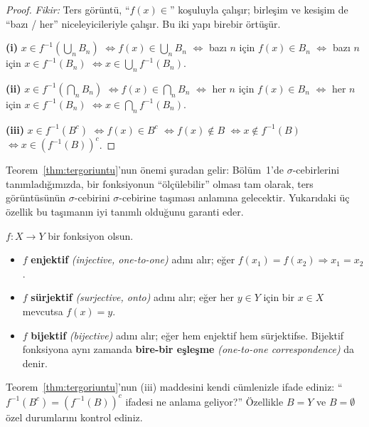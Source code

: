 \begin{proof}
\textit{Fikir:} Ters görüntü, ``$f(x) \in$'' koşuluyla çalışır; birleşim ve
kesişim de ``bazı / her'' niceleyicileriyle çalışır. Bu iki yapı birebir örtüşür.

\medskip

\textbf{(i)}\; $x \in f^{-1}\!\left(\bigcup_n B_n\right)$
$\iff f(x) \in \bigcup_n B_n$
$\iff$ bazı $n$ için $f(x) \in B_n$
$\iff$ bazı $n$ için $x \in f^{-1}(B_n)$
$\iff x \in \bigcup_n f^{-1}(B_n)$.

\textbf{(ii)}\; $x \in f^{-1}\!\left(\bigcap_n B_n\right)$
$\iff f(x) \in \bigcap_n B_n$
$\iff$ her $n$ için $f(x) \in B_n$
$\iff$ her $n$ için $x \in f^{-1}(B_n)$
$\iff x \in \bigcap_n f^{-1}(B_n)$.

\textbf{(iii)}\; $x \in f^{-1}(B^c)$
$\iff f(x) \in B^c$
$\iff f(x) \notin B$
$\iff x \notin f^{-1}(B)$
$\iff x \in \left(f^{-1}(B)\right)^c$.
\end{proof}

\begin{notkutu}
Teorem~\ref{thm:tergoriuntu}'nun önemi şuradan gelir: Bölüm~1'de
$\sigma$-cebirlerini tanımladığımızda, bir fonksiyonun ``ölçülebilir'' olması tam
olarak, ters görüntüsünün $\sigma$-cebirini $\sigma$-cebirine taşıması anlamına
gelecektir. Yukarıdaki üç özellik bu taşımanın iyi tanımlı olduğunu garanti eder.
\end{notkutu}

\begin{tanim}\label{def:bijektif}
$f: X \to Y$ bir fonksiyon olsun.
\begin{itemize}
  \item $f$ \textbf{enjektif} \emph{(injective, one-to-one)} adını alır;
        eğer $f(x_1) = f(x_2) \Rightarrow x_1 = x_2$.
  \item $f$ \textbf{sürjektif} \emph{(surjective, onto)} adını alır;
        eğer her $y \in Y$ için bir $x \in X$ mevcutsa $f(x) = y$.
  \item $f$ \textbf{bijektif} \emph{(bijective)} adını alır;
        eğer hem enjektif hem sürjektifse.
        Bijektif fonksiyona aynı zamanda \textbf{bire-bir eşleşme}
        \emph{(one-to-one correspondence)} da denir.
\end{itemize}
\end{tanim}

\begin{kendinleifade}
Teorem~\ref{thm:tergoriuntu}'nun (iii) maddesini kendi cümlenizle ifade ediniz:
``$f^{-1}(B^c) = (f^{-1}(B))^c$ ifadesi ne anlama geliyor?''
Özellikle $B = Y$ ve $B = \emptyset$ özel durumlarını kontrol ediniz.
\end{kendinleifade}

